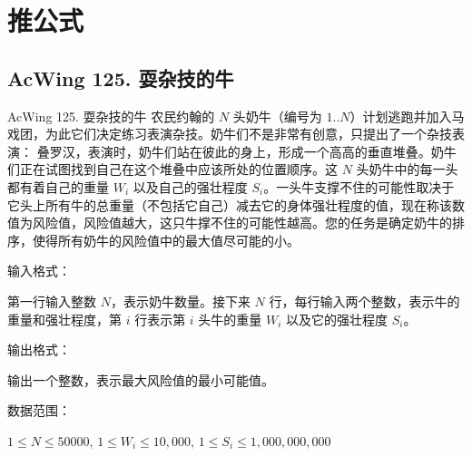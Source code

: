 \section{推公式}

\subsection{AcWing 125. 耍杂技的牛}
\begin{titledbox}{AcWing 125. 耍杂技的牛}
    农民约翰的 $N$ 头奶牛（编号为 $1..N$）计划逃跑并加入马戏团，为此它们决定练习表演杂技。奶牛们不是非常有创意，只提出了一个杂技表演： 叠罗汉，表演时，奶牛们站在彼此的身上，形成一个高高的垂直堆叠。奶牛们正在试图找到自己在这个堆叠中应该所处的位置顺序。这 $N$ 头奶牛中的每一头都有着自己的重量 $W_i$ 以及自己的强壮程度 $S_i$。一头牛支撑不住的可能性取决于它头上所有牛的总重量（不包括它自己）减去它的身体强壮程度的值，现在称该数值为风险值，风险值越大，这只牛撑不住的可能性越高。您的任务是确定奶牛的排序，使得所有奶牛的风险值中的最大值尽可能的小。

    输入格式：

    第一行输入整数 $N$，表示奶牛数量。接下来 $N$ 行，每行输入两个整数，表示牛的重量和强壮程度，第 $i$ 行表示第 $i$ 头牛的重量 $W_i$ 以及它的强壮程度 $S_i$。

    输出格式：

    输出一个整数，表示最大风险值的最小可能值。

    数据范围：

    $1 \le N \le 50000$, $1 \le W_i \le 10,000$, $1 \le S_i \le 1,000,000,000$

    \begin{inputblock}
         \\
         \\
         \\
    \end{inputblock}
    \begin{outputblock}
    \end{outputblock}
\end{titledbox}
